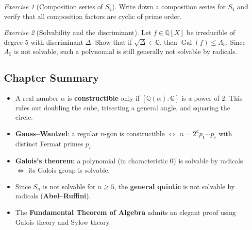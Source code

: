 \documentclass[12pt,a4paper,openany]{book}
\theoremstyle{definition}
\theoremstyle{remark}
\newtheorem{exercise}{Exercise}[chapter]
\newcommand{\Q}{\mathbb{Q}}
\DeclareMathOperator{\Gal}{Gal}
\begin{document}
\begin{exercise}[Composition series of $S_4$]\label{exo:comp-s4}
Write down a composition series for $S_{4}$ and verify that all composition
factors are cyclic of prime order.
\end{exercise}

\begin{exercise}[Solvability and the discriminant]\label{exo:discriminant-solvable}
Let $f\in\Q[X]$ be irreducible of degree $5$ with discriminant $\Delta$.
Show that if $\sqrt{\Delta}\in\Q$, then $\Gal(f)\leq A_{5}$.  Since $A_{5}$
is not solvable, such a polynomial is still generally not solvable by
radicals.
\end{exercise}

\subsection*{Chapter Summary}

\begin{itemize}
\item A real number $\alpha$ is \textbf{constructible} only if
$[\Q(\alpha):\Q]$ is a power of $2$.  This rules out doubling the cube,
trisecting a general angle, and squaring the circle.
\item \textbf{Gauss--Wantzel}: a regular $n$-gon is constructible
$\Leftrightarrow$ $n=2^{a}p_{1}\cdots p_{r}$ with distinct Fermat primes
$p_{i}$.
\item \textbf{Galois's theorem}: a polynomial (in characteristic $0$) is
solvable by radicals $\Leftrightarrow$ its Galois group is solvable.
\item Since $S_{n}$ is not solvable for $n\geq 5$, the \textbf{general
quintic} is not solvable by radicals (\textbf{Abel--Ruffini}).
\item The \textbf{Fundamental Theorem of Algebra} admits an elegant proof
using Galois theory and Sylow theory.
\end{itemize}
\end{document}
